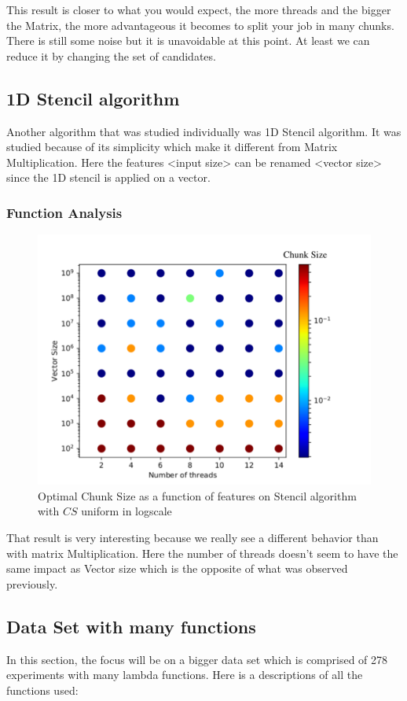 This result is closer to what you would expect, the more threads and the bigger the Matrix, the more advantageous it becomes to split your job in many chunks. There is still some noise but it is unavoidable at this point. At least we can reduce it by changing the set of candidates.
\subsection{1D Stencil algorithm}

Another algorithm that was studied individually was 1D Stencil algorithm. It was studied because of its simplicity which make it different from Matrix Multiplication. Here the features <input size> can be renamed <vector size> since the 1D stencil is applied on a vector.
\newpage
\subsubsection{Function Analysis}

\begin{figure}[h]
	\centering
	\includegraphics[scale=0.8]{images/stencil_function.pdf}
	\caption{Optimal Chunk Size as a function of features on Stencil algorithm with $CS$ uniform in logscale}
\end{figure}
That result is very interesting because we really see a different behavior than with matrix Multiplication. Here the number of threads doesn't seem to have the same impact as Vector size which is the opposite of what was observed previously.

\newpage
\subsection{Data Set with many functions}
In this section, the focus will be on a bigger data set which is comprised of 278 experiments with many lambda functions. Here is a descriptions of all the functions used:



